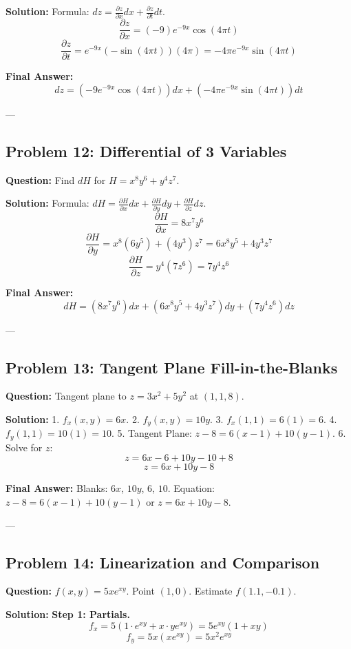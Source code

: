 \documentclass{article}
\begin{document}
\textbf{Solution:}
Formula: $dz = \frac{\partial z}{\partial x} dx + \frac{\partial z}{\partial t} dt$.
\[ \frac{\partial z}{\partial x} = (-9)e^{-9x} \cos(4\pi t) \]
\[ \frac{\partial z}{\partial t} = e^{-9x} (-\sin(4\pi t)) (4\pi) = -4\pi e^{-9x} \sin(4\pi t) \]

\textbf{Final Answer:}
\[ dz = \left( -9e^{-9x} \cos(4\pi t) \right) dx + \left( -4\pi e^{-9x} \sin(4\pi t) \right) dt \]

---

\subsection*{Problem 12: Differential of 3 Variables}
\textbf{Question:} Find $dH$ for $H = x^8 y^6 + y^4 z^7$.

\textbf{Solution:}
Formula: $dH = \frac{\partial H}{\partial x} dx + \frac{\partial H}{\partial y} dy + \frac{\partial H}{\partial z} dz$.
\[ \frac{\partial H}{\partial x} = 8x^7 y^6 \]
\[ \frac{\partial H}{\partial y} = x^8 (6y^5) + (4y^3) z^7 = 6x^8 y^5 + 4y^3 z^7 \]
\[ \frac{\partial H}{\partial z} = y^4 (7z^6) = 7y^4 z^6 \]

\textbf{Final Answer:}
\[ dH = (8x^7 y^6) dx + (6x^8 y^5 + 4y^3 z^7) dy + (7y^4 z^6) dz \]

---

\subsection*{Problem 13: Tangent Plane Fill-in-the-Blanks}
\textbf{Question:} Tangent plane to $z = 3x^2 + 5y^2$ at $(1, 1, 8)$.

\textbf{Solution:}
1. $f_x(x, y) = 6x$.
2. $f_y(x, y) = 10y$.
3. $f_x(1, 1) = 6(1) = 6$.
4. $f_y(1, 1) = 10(1) = 10$.
5. Tangent Plane: $z - 8 = 6(x - 1) + 10(y - 1)$.
6. Solve for $z$:
\[ z = 6x - 6 + 10y - 10 + 8 \]
\[ z = 6x + 10y - 8 \]

\textbf{Final Answer:}
Blanks: $6x$, $10y$, $6$, $10$.
Equation: $z - 8 = 6(x - 1) + 10(y - 1)$ or $z = 6x + 10y - 8$.

---

\subsection*{Problem 14: Linearization and Comparison}
\textbf{Question:} $f(x, y) = 5xe^{xy}$. Point $(1, 0)$. Estimate $f(1.1, -0.1)$.

\textbf{Solution:}
\textbf{Step 1: Partials.}
\[ f_x = 5(1 \cdot e^{xy} + x \cdot ye^{xy}) = 5e^{xy}(1 + xy) \]
\[ f_y = 5x(xe^{xy}) = 5x^2 e^{xy} \]
\end{document}
